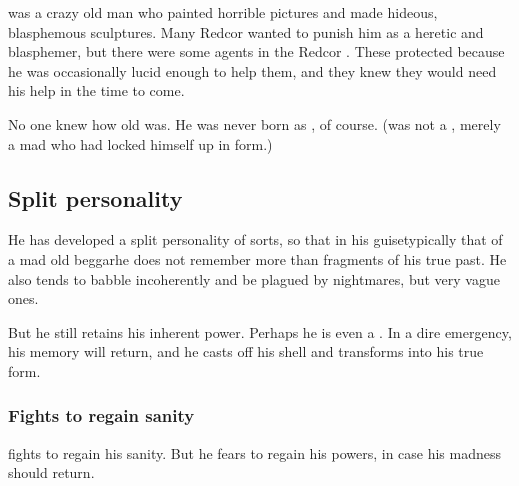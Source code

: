 \Herette was a crazy old \human man who painted horrible pictures and made hideous, blasphemous sculptures. 
Many Redcor wanted to punish him as a heretic and blasphemer, but there were some \Kezeradi agents in the Redcor .
These protected \Herette because he was occasionally lucid enough to help them, and they knew they would need his help in the time to come. 

No one knew how old \Herette was. 
He was never born as \human, of course. 
(\Sithiyacaan was not a \malach, merely a mad \resphan who had locked himself up in \human form.)









\subsection{Split personality}
He has developed a split personality of sorts, so that in his guise\dash typically that of a mad old beggar\dash he does not remember more than fragments of his true past. He also tends to babble incoherently and be plagued by nightmares, but very vague ones. 

But he still retains his inherent \resphan{} power. Perhaps he is even a . In a dire emergency, his memory will return, and he casts off his \human{} shell and transforms into his true form.





\subsubsection{Fights to regain sanity}
\Sithiyacaan{} fights to regain his sanity. 
But he fears to regain his powers, in case his madness should return. 


